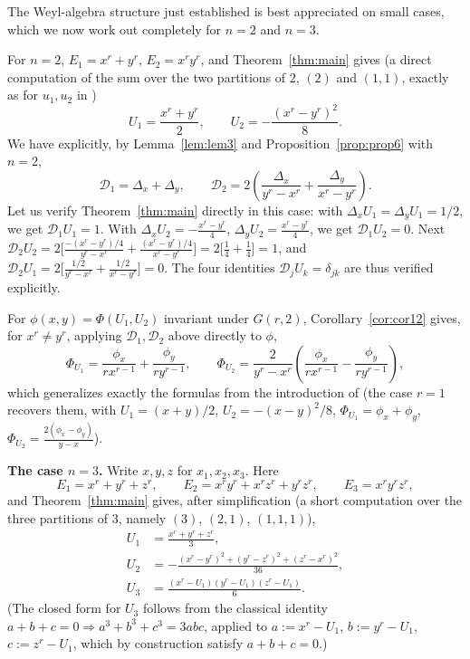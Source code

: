 \documentclass[10pt,a4paper]{amsart}
\begin{document}
The Weyl-algebra structure just established is best appreciated on small cases, which we now work out completely for $n=2$ and $n=3$.

For $n=2$, $E_1=x^r+y^r$, $E_2=x^ry^r$, and Theorem~\ref{thm:main} gives (a direct computation of the sum over the two partitions of $2$, $(2)$ and $(1,1)$, exactly as for $u_1,u_2$ in \cite{Ze})
\[
U_1 = \frac{x^r+y^r}{2}, \qquad U_2 = -\frac{(x^r-y^r)^2}{8}.
\]
We have explicitly, by Lemma~\ref{lem:lem3} and Proposition~\ref{prop:prop6} with $n=2$,
\[
\mathcal D_1 = \Delta_x+\Delta_y, \qquad \mathcal D_2 = 2\left(\frac{\Delta_x}{y^r-x^r}+\frac{\Delta_y}{x^r-y^r}\right).
\]
Let us verify Theorem~\ref{thm:main} directly in this case: with $\Delta_xU_1=\Delta_yU_1=1/2$, we get $\mathcal D_1U_1=1$. With $\Delta_xU_2=-\frac{x^r-y^r}{4}$, $\Delta_yU_2=\frac{x^r-y^r}{4}$, we get $\mathcal D_1U_2=0$. Next $\mathcal D_2U_2 = 2\big[\frac{-(x^r-y^r)/4}{y^r-x^r}+\frac{(x^r-y^r)/4}{x^r-y^r}\big]=2\big[\frac14+\frac14\big]=1$, and $\mathcal D_2U_1=2\big[\frac{1/2}{y^r-x^r}+\frac{1/2}{x^r-y^r}\big]=0$. The four identities $\mathcal D_jU_k=\delta_{jk}$ are thus verified explicitly.

For $\phi(x,y)=\Phi(U_1,U_2)$ invariant under $G(r,2)$, Corollary~\ref{cor:cor12} gives, for $x^r\ne y^r$, applying $\mathcal D_1,\mathcal D_2$ above directly to $\phi$,
\[
\Phi_{U_1} = \frac{\phi_x}{r x^{r-1}} + \frac{\phi_y}{r y^{r-1}}, \qquad
\Phi_{U_2} = \frac{2}{y^r-x^r}\left(\frac{\phi_x}{r x^{r-1}} - \frac{\phi_y}{r y^{r-1}}\right),
\]
which generalizes exactly the formulas from the introduction of \cite{Ze} (the case $r=1$ recovers them, with $U_1=(x+y)/2$, $U_2=-(x-y)^2/8$, $\Phi_{U_1}=\phi_x+\phi_y$, $\Phi_{U_2}=\frac{2(\phi_x-\phi_y)}{y-x}$).

\bigskip
\noindent\textbf{The case $n=3$.} Write $x,y,z$ for $x_1,x_2,x_3$. Here
\[
E_1=x^r+y^r+z^r,\qquad E_2=x^ry^r+x^rz^r+y^rz^r,\qquad E_3=x^ry^rz^r,
\]
and Theorem~\ref{thm:main} gives, after simplification (a short computation over the three partitions of $3$, namely $(3)$, $(2,1)$, $(1,1,1)$),
\begin{align*}
U_1&=\frac{x^r+y^r+z^r}{3},\\
U_2&=-\frac{(x^r-y^r)^2+(y^r-z^r)^2+(z^r-x^r)^2}{36},\\
U_3&=\frac{(x^r-U_1)(y^r-U_1)(z^r-U_1)}{6}.
\end{align*}
(The closed form for $U_3$ follows from the classical identity $a+b+c=0\Rightarrow a^3+b^3+c^3=3abc$, applied to $a:=x^r-U_1$, $b:=y^r-U_1$, $c:=z^r-U_1$, which by construction satisfy $a+b+c=0$.)
\end{document}
